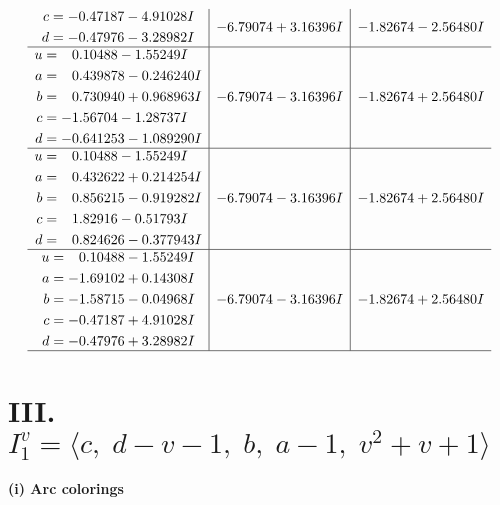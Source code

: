 \documentclass[1p]{elsarticle_modified}
\theoremstyle{definition}
\begin{document}
$$\begin{array}{c|c|c}
\begin{aligned}
c &= -0.47187 - 4.91028 I \\
d &= -0.47976 - 3.28982 I\end{aligned}
 & -6.79074 + 3.16396 I & -1.82674 - 2.56480 I \\ \hline\begin{aligned}
u &= \phantom{-}0.10488 - 1.55249 I \\
a &= \phantom{-}0.439878 - 0.246240 I \\
b &= \phantom{-}0.730940 + 0.968963 I \\
c &= -1.56704 - 1.28737 I \\
d &= -0.641253 - 1.089290 I\end{aligned}
 & -6.79074 - 3.16396 I & -1.82674 + 2.56480 I \\ \hline\begin{aligned}
u &= \phantom{-}0.10488 - 1.55249 I \\
a &= \phantom{-}0.432622 + 0.214254 I \\
b &= \phantom{-}0.856215 - 0.919282 I \\
c &= \phantom{-}1.82916 - 0.51793 I \\
d &= \phantom{-}0.824626 - 0.377943 I\end{aligned}
 & -6.79074 - 3.16396 I & -1.82674 + 2.56480 I \\ \hline\begin{aligned}
u &= \phantom{-}0.10488 - 1.55249 I \\
a &= -1.69102 + 0.14308 I \\
b &= -1.58715 - 0.04968 I \\
c &= -0.47187 + 4.91028 I \\
d &= -0.47976 + 3.28982 I\end{aligned}
 & -6.79074 - 3.16396 I & -1.82674 + 2.56480 I\\
 \hline 
 \end{array}$$\newpage\newpage\renewcommand{\arraystretch}{1}
\centering \section*{III. $I^v_{1}= \langle c,\;d- v-1,\;b,\;a-1,\;v^2+v+1 \rangle$}
\flushleft \textbf{(i) Arc colorings}\\
\end{document}
